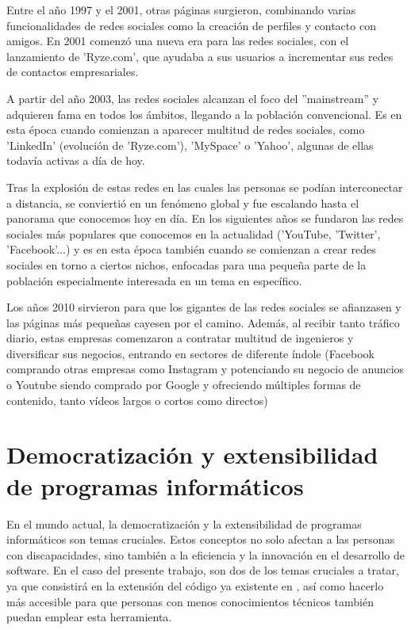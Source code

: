 Entre el año 1997 y el 2001, otras páginas surgieron, combinando varias funcionalidades de redes sociales como la creación de perfiles y contacto con amigos. En 2001 comenzó una nueva era para las redes sociales, con el lanzamiento de 'Ryze.com', que ayudaba a sus usuarios a incrementar sus redes de contactos empresariales.

A partir del año 2003, las redes sociales alcanzan el foco del ''mainstream'' y adquieren fama en todos los ámbitos, llegando a la población convencional. Es en esta época cuando comienzan a aparecer multitud de redes sociales, como 'LinkedIn' (evolución de 'Ryze.com'), 'MySpace' o 'Yahoo', algunas de ellas todavía activas a día de hoy.

Tras la explosión de estas redes en las cuales las personas se podían interconectar a distancia, se conviertió en un fenómeno global y fue escalando hasta el panorama que conocemos hoy en día. En los siguientes años se fundaron las redes sociales más populares que conocemos en la actualidad ('YouTube, 'Twitter', 'Facebook'...) y es en esta época también cuando se comienzan a crear redes sociales en torno a ciertos nichos, enfocadas para una pequeña parte de la población especialmente interesada en un tema en específico.

Los años 2010 sirvieron para que los gigantes de las redes sociales se afianzasen y las páginas más pequeñas cayesen por el camino. Además, al recibir tanto tráfico diario, estas empresas comenzaron a contratar multitud de ingenieros y diversificar sus negocios, entrando en sectores de diferente índole (Facebook comprando otras empresas como Instagram y potenciando su negocio de anuncios o Youtube siendo comprado por Google y ofreciendo múltiples formas de contenido, tanto vídeos largos o cortos como directos)

\section{Democratización y extensibilidad de programas informáticos}

En el mundo actual, la democratización y la extensibilidad de programas informáticos son temas cruciales. Estos conceptos no solo afectan a las personas con discapacidades, sino también a la eficiencia y la innovación en el desarrollo de software. En el caso del presente trabajo, son dos de los temas cruciales a tratar, ya que consistirá en la extensión del código ya existente en \ga, así como hacerlo más accesible para que personas con menos conocimientos técnicos también puedan emplear esta herramienta.

